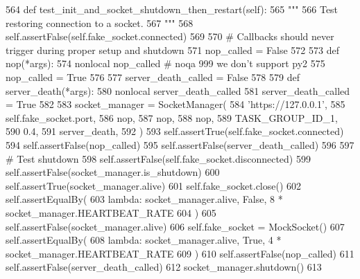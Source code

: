 \begin{DoxyCode}
564     \textcolor{keyword}{def }test\_init\_and\_socket\_shutdown\_then\_restart(self):
565         \textcolor{stringliteral}{"""}
566 \textcolor{stringliteral}{        Test restoring connection to a socket.}
567 \textcolor{stringliteral}{        """}
568         self.assertFalse(self.fake\_socket.connected)
569 
570         \textcolor{comment}{# Callbacks should never trigger during proper setup and shutdown}
571         nop\_called = \textcolor{keyword}{False}
572 
573         \textcolor{keyword}{def }nop(*args):
574             nonlocal nop\_called  \textcolor{comment}{# noqa 999 we don't support py2}
575             nop\_called = \textcolor{keyword}{True}
576 
577         server\_death\_called = \textcolor{keyword}{False}
578 
579         \textcolor{keyword}{def }server\_death(*args):
580             nonlocal server\_death\_called
581             server\_death\_called = \textcolor{keyword}{True}
582 
583         socket\_manager = SocketManager(
584             \textcolor{stringliteral}{'https://127.0.0.1'},
585             self.fake\_socket.port,
586             nop,
587             nop,
588             nop,
589             TASK\_GROUP\_ID\_1,
590             0.4,
591             server\_death,
592         )
593         self.assertTrue(self.fake\_socket.connected)
594         self.assertFalse(nop\_called)
595         self.assertFalse(server\_death\_called)
596 
597         \textcolor{comment}{# Test shutdown}
598         self.assertFalse(self.fake\_socket.disconnected)
599         self.assertFalse(socket\_manager.is\_shutdown)
600         self.assertTrue(socket\_manager.alive)
601         self.fake\_socket.close()
602         self.assertEqualBy(
603             \textcolor{keyword}{lambda}: socket\_manager.alive, \textcolor{keyword}{False}, 8 * socket\_manager.HEARTBEAT\_RATE
604         )
605         self.assertFalse(socket\_manager.alive)
606         self.fake\_socket = MockSocket()
607         self.assertEqualBy(
608             \textcolor{keyword}{lambda}: socket\_manager.alive, \textcolor{keyword}{True}, 4 * socket\_manager.HEARTBEAT\_RATE
609         )
610         self.assertFalse(nop\_called)
611         self.assertFalse(server\_death\_called)
612         socket\_manager.shutdown()
613 
\end{DoxyCode}
\mbox{\label{classparlai_1_1mturk_1_1core_1_1test_1_1test__socket__manager_1_1TestSocketManagerSetupAndFunctions_a6512d80f63f187d55bef6e2ae01084ec}} 
